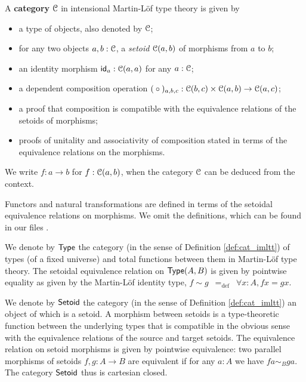 \documentclass[a4paper,USenglish]{lipics}
\newcommand{\parencite}[1]{\cite{#1}}
\newcommand{\fat}[1]{\textbf{#1}}
\begin{document}
\begin{definition}[Category in IMLTT, \parencite{aczel_galois, concat}]
 \label{def:cat_imltt}
  A \fat{category} ${\mathcal{C}}$ in intensional Martin-Löf type theory  is given by
  \begin{itemize}
   \item a type of objects, also denoted by ${\mathcal{C}}$;
   \item for any two objects $a,b:{\mathcal{C}}$, a \emph{setoid} ${\mathcal{C}}(a,b)$ of morphisms from $a$ to $b$;
   \item an identity morphism $\mathsf{id}_a : {\mathcal{C}}(a,a)$ for any $a:{\mathcal{C}}$;
   \item a dependent composition operation $({} \circ {})_{a,b,c} : {\mathcal{C}}(b,c) \times {\mathcal{C}}(a,b) \to {\mathcal{C}}(a,c)$;
   \item a proof that composition is compatible with the equivalence relations of the setoids of morphisms;
   \item proofs of unitality and associativity of composition stated in terms of the equivalence relations on the morphisms.
  \end{itemize}
  We write $f:a\to b$ for $f : {\mathcal{C}}(a,b)$, when the category ${\mathcal{C}}$ can be deduced from the context.
\end{definition}

Functors and natural transformations are defined in terms of the setoidal equivalence relations on morphisms.
We omit the definitions, which can be found in our \coq files \parencite{trimat_coq}.

\begin{definition}
\label{def:set_setoid}
 We denote by $\mathsf{Type}$ the category (in the sense of Definition \ref{def:cat_imltt}) of types (of a fixed universe) and total functions between them in Martin-L\"of type theory. 
 The setoidal equivalence relation on $\mathsf{Type}(A,B)$ is given by pointwise equality as given by the Martin-Löf identity type,
   $f \sim g \enspace =_{\text{def}} \enspace \forall x:A, fx = gx$.
 
 We denote by $\mathsf{Setoid}$ the category (in the sense of Definition \ref{def:cat_imltt}) an object of which is a setoid.
 A morphism between setoids is a type-theoretic function between the underlying types that is compatible in the obvious sense with the equivalence relations of the source and target setoids.
 The equivalence relation on setoid morphisms is given by pointwise equivalence:
 two parallel morphisms of setoids $f,g:A\to B$ are equivalent if for any $a:A$ we have $fa \sim_B ga$.
 The category $\mathsf{Setoid}$ thus is cartesian closed.
 
\end{definition}
\end{document}
